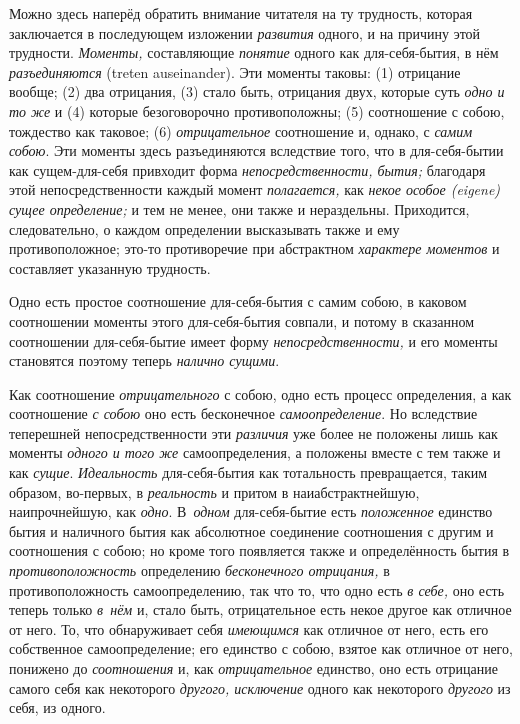 Можно здесь наперёд обратить внимание читателя на ту трудность, которая
заключается в последующем изложении {\em развития}
одного, и на причину этой трудности. {\em Моменты,}
составляющие {\em понятие} одного как для-себя-бытия, в
нём {\em разъединяются} (treten auseinander). Эти
моменты таковы: (1) отрицание вообще; (2) два отрицания, (3) стало быть,
отрицания двух, которые суть {\em одно и то же} и (4)
которые безоговорочно противоположны; (5) соотношение с собою, тождество
как таковое; (6) {\em отрицательное} соотношение и,
однако, с {\em самим собою}. Эти моменты здесь
разъединяются вследствие того, что в для-себя-бытии как сущем-для-себя
привходит форма {\em непосредственности, бытия;}
благодаря этой непосредственности каждый
момент {\em полагается,} как
{\em некое особое (eigene) сущее определение;} и тем не
менее, они также и нераздельны. Приходится, следовательно, о каждом
определении высказывать также и ему противоположное; это-то противоречие
при абстрактном {\em характере моментов} и составляет указанную трудность.


Одно есть простое соотношение для-себя-бытия с самим собою, в каковом
соотношении моменты этого для-себя-бытия совпали, и потому в сказанном
соотношении для-себя-бытие имеет форму
{\em непосредственности,} и его моменты становятся
поэтому теперь {\em налично сущими}.

Как соотношение {\em отрицательного} с собою, одно есть
процесс определения, а как соотношение {\em с собою}
оно есть бесконечное {\em самоопределение}. Но
вследствие теперешней непосредственности эти
{\em различия} уже более не положены лишь как моменты
{\em одного и того же} самоопределения, а положены
вместе с тем также и как {\em сущие}.
{\em Идеальность} для-себя-бытия как тотальность
превращается, таким образом, во-первых, в
{\em реальность} и притом в наиабстрактнейшую,
наипрочнейшую, как {\em одно}. В~{\em одном} для-себя-бытие есть
{\em положенное} единство бытия и наличного бытия как
абсолютное соединение соотношения с другим и соотношения с собою; но кроме
того появляется также и определённость бытия в
{\em противоположность} определению
{\em бесконечного отрицания,} в противоположность
самоопределению, так что то, что одно есть {\em в
себе,} оно есть теперь только {\em в~нём} и, стало
быть, отрицательное есть некое другое как отличное от него. То, что
обнаруживает себя {\em имеющимся} как отличное от него,
есть его собственное самоопределение; его единство с собою, взятое как
отличное от него, понижено до {\em соотношения} и, как
{\em отрицательное} единство, оно есть отрицание самого
себя как некоторого {\em другого, исключение} одного как некоторого
{\em другого} из себя, из одного.

